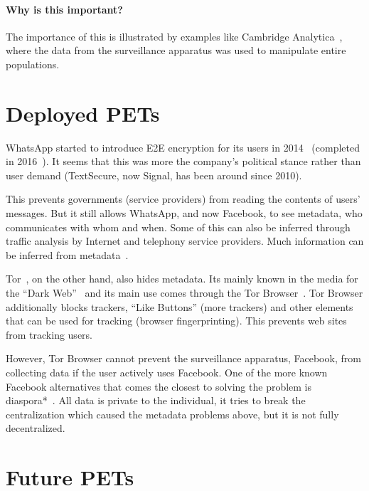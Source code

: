 \paragraph{Why is this important?}

The importance of this is illustrated by examples like Cambridge 
Analytica~\cite{%
  cambridge-analytica-wired,
  cambridge-analytica-guardian,
  cambridge-analytica-nytimes,
  cambridge-analytica-wp%
}, where the data from the surveillance apparatus was used to manipulate entire 
populations.


\section{Deployed \acp{PET}}

WhatsApp started to introduce \ac{E2E} encryption for its users in 
2014~\cite{WhatsAppIntroducesE2Eencryption} (completed in 
2016~\cite{WhatsAppE2Ecomplete}).
It seems that this was more the company's political stance rather than user 
demand (TextSecure, now Signal, has been around since 2010).

This prevents governments (\ie service providers) from reading the contents of 
users' messages.
But it still allows WhatsApp, and now Facebook, to see metadata, \ie who 
communicates with whom and when.
Some of this can also be inferred through traffic analysis by \eg Internet and 
telephony service providers.
Much information can be inferred from metadata~\cite{?}.

Tor~\cite{Tor}, on the other hand, also hides metadata.
Its mainly known in the media for the \enquote{Dark Web}~\cite{?} and its main 
use comes through the Tor Browser~\cite{?}.
Tor Browser additionally blocks trackers, \enquote{Like Buttons} (\ie more 
trackers) and other elements that can be used for tracking (\eg browser 
fingerprinting).
This prevents web sites from tracking users.

However, Tor Browser cannot prevent the surveillance apparatus, \eg Facebook, 
from collecting data if the user actively uses Facebook.
One of the more known Facebook alternatives that comes the closest to solving 
the problem is diaspora*~\cite{?}.
All data is private to the individual, it tries to break the centralization 
which caused the metadata problems above, but it is not fully decentralized.


\section{Future \acp{PET}}

